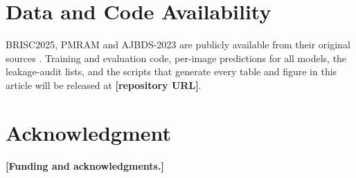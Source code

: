 \documentclass[journal]{IEEEtran}
\begin{document}
\section*{Data and Code Availability}
BRISC2025, PMRAM and AJBDS-2023 are publicly available from their original sources \cite{fateh2026brisc,prottoy2024pmram,amin2023ajbds}. Training and evaluation code, per-image predictions for all models, the leakage-audit lists, and the scripts that generate every table and figure in this article will be released at \textbf{[repository URL]}.

\section*{Acknowledgment}
\textbf{[Funding and acknowledgments.]}



\end{document}
